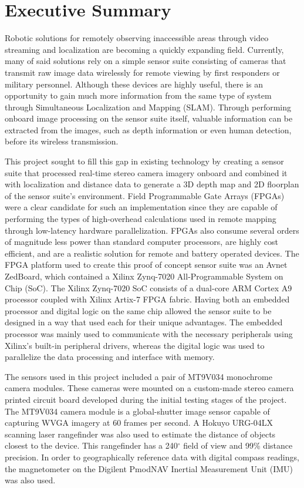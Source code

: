 {}
\section*{Executive Summary}
Robotic solutions for remotely observing inaccessible areas through video streaming and localization are becoming a quickly expanding field. Currently, many of said solutions rely on a simple sensor suite consisting of cameras that transmit raw image data wirelessly for remote viewing by first responders or military personnel. Although these devices are highly useful, there is an opportunity to gain much more information from the same type of system through Simultaneous Localization and Mapping (SLAM). Through performing onboard image processing on the sensor suite itself, valuable information can be extracted from the images, such as depth information or even human detection, before its wireless transmission.
\par
This project sought to fill this gap in existing technology by creating a sensor suite that processed real-time stereo camera imagery onboard and combined it with localization and distance data to generate a 3D depth map and 2D floorplan of the sensor suite's environment. Field Programmable Gate Arrays (FPGAs) were a clear candidate for such an implementation since they are capable of performing the types of high-overhead calculations used in remote mapping through low-latency hardware parallelization. FPGAs also consume several orders of magnitude less power than standard computer processors, are highly cost efficient, and are a realistic solution for remote and battery operated devices. The FPGA platform used to create this proof of concept sensor suite was an Avnet ZedBoard, which contained a Xilinx Zynq-7020 All-Programmable System on Chip (SoC). The Xilinx Zynq-7020 SoC consists of a dual-core ARM Cortex A9 processor coupled with Xilinx Artix-7 FPGA fabric. Having both an embedded processor and digital logic on the same chip allowed the sensor suite to be designed in a way that used each for their unique advantages. The embedded processor was mainly used to communicate with the necessary peripherals using Xilinx's built-in peripheral drivers, whereas the digital logic was used to parallelize the data processing and interface with memory.
\par
The sensors used in this project included a pair of MT9V034 monochrome camera modules. These cameras were mounted on a custom-made stereo camera printed circuit board developed during the initial testing stages of the project. The MT9V034 camera module is a global-shutter image sensor capable of capturing WVGA imagery at 60 frames per second. A Hokuyo URG-04LX scanning laser rangefinder was also used to estimate the distance of objects closest to the device. This rangefinder has a 240$^\circ$ field of view and 99\% distance precision. In order to geographically reference data with digital compass readings, the magnetometer on the Digilent PmodNAV Inertial Measurement Unit (IMU) was also used. 
